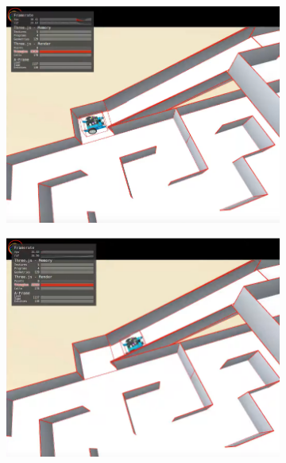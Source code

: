 \begin{figure}[h!]
\begin{subfigure}[b]{0.5\textwidth}
    \includegraphics[width=\textwidth, height=\textwidth]{laberinto1.png}
  \end{subfigure}
  \hfill
  \hfill
  \begin{subfigure}[b]{0.5\textwidth}
    \includegraphics[width=\textwidth, height=\textwidth]{laberinto2.png}

\end{subfigure}
\end{figure}
